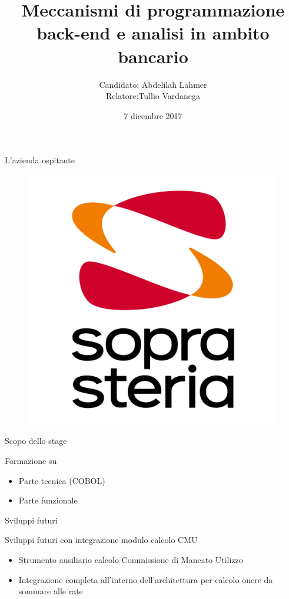 \documentclass[aspectratio=43]{beamer}
\title{Meccanismi di programmazione back-end e analisi in ambito bancario}
\author{Candidato: Abdelilah Lahmer \\Relatore:\hspace{13pt}Tullio Vardanega \vspace{15pt}}
\date{7 dicembre 2017}
\begin{document}
	
	\maketitle


	\begin{frame}{L'azienda ospitante}

		\begin{figure}[H]
			\centering
			\includegraphics[scale=0.15]{images/SopraSteriaLogo}
		\end{figure}

	\end{frame}


	\begin{frame}{Scopo dello stage}

		Formazione su
		\begin{itemize}
			\item Parte tecnica (COBOL)
			\item Parte funzionale
		\end{itemize}

	\end{frame}


	\begin{frame}{Sviluppi futuri}

		Sviluppi futuri con integrazione modulo calcolo CMU
		\begin{itemize}
			\item Strumento ausiliario calcolo Commissione di Mancato Utilizzo
			\item Integrazione completa all'interno dell'architettura per calcolo onere da sommare alle rate
		\end{itemize}

	\end{frame}
\end{document}
